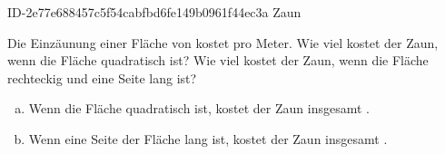 \begin{exercise}
      {ID-2e77e688457c5f54cabfbd6fe149b0961f44ec3a}
      {Zaun}
  \ifproblem\problem\par
    Die Einzäunung einer Fläche von  kostet  pro Meter.
    Wie viel kostet der Zaun, wenn die Fläche quadratisch ist?
    Wie viel kostet der Zaun, wenn die Fläche rechteckig und
    eine Seite  lang ist?
  \fi
  \ifoutcome\outcome\par
    \begin{enumerate}[a)]
      \item Wenn die Fläche quadratisch ist,
            kostet der Zaun insgesamt .
      \item Wenn eine Seite der Fläche  lang ist,
            kostet der Zaun insgesamt .
    \end{enumerate}
  \fi
\end{exercise}
